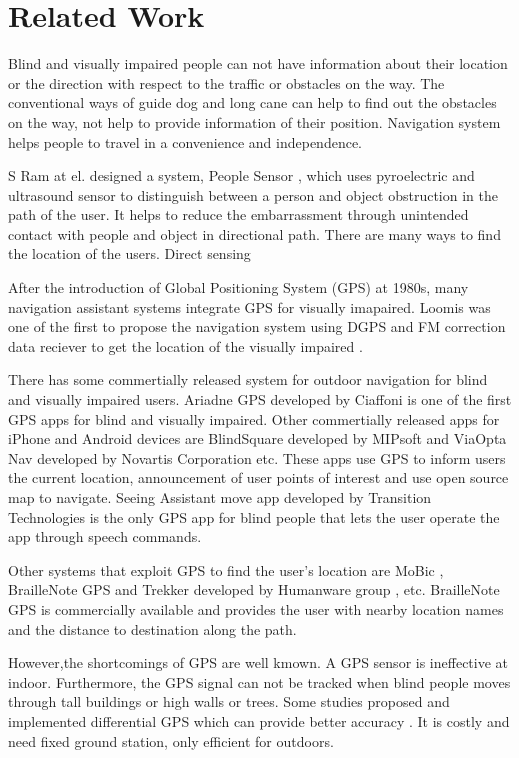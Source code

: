 \chapter{Related Work}
\label{c:relw}

Blind and visually impaired people can not have information about their location or the direction with respect to the traffic or obstacles on the way.
The conventional ways of guide dog and long cane can help to find out the obstacles on the way, not help to provide information of their position.
Navigation system helps people to travel in a convenience and independence.

S Ram at el. designed a system, People Sensor \cite{peoplesensor}, which uses pyroelectric and ultrasound sensor to distinguish between a person and object obstruction in the path of the user.
It helps to reduce the embarrassment through unintended contact with people and object in directional path.
There are many ways to find the location of the users.
Direct sensing 

After the introduction of Global Positioning System (GPS) at 1980s, many navigation assistant systems integrate GPS for visually imapaired.
Loomis was one of the first to propose the navigation system using DGPS and FM correction data reciever to get the location of the visually impaired \cite{loomis1,loomis,loomis2}.

There has some commertially released system for outdoor navigation for blind and visually impaired users.
Ariadne GPS \cite{arigps} developed by Ciaffoni is one of the first GPS apps for blind and visually impaired.
Other commertially released apps for iPhone and Android devices are BlindSquare \cite{blindsq} developed by MIPsoft and ViaOpta Nav \cite{viaopta} developed by Novartis Corporation etc.
These apps use GPS to inform users the current location, announcement of user points of interest and use open source map to navigate.
Seeing Assistant move app \cite{seeing} developed by Transition Technologies is the only GPS app for blind people that lets the user operate the app through speech commands.

Other systems that exploit GPS to find the user’s location are MoBic \cite{mobic}, BrailleNote GPS and Trekker developed by Humanware group \cite{human}, etc. BrailleNote GPS is commercially available and provides the user with nearby location names and the distance to destination along the path. 

However,the shortcomings of GPS are well kmown.
A GPS sensor is ineffective at indoor.
Furthermore, the GPS signal can not be tracked when blind people moves through tall buildings or high walls or trees.
Some studies proposed and implemented differential GPS which can provide better accuracy \cite{drishti2,gps}.
It is costly and need fixed ground station, only efficient for outdoors.



\cite{traffic_turan}

